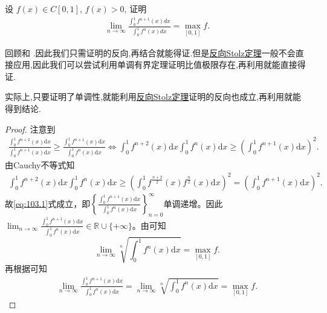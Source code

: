 \documentclass[../../main.tex]{subfiles}
\begin{document}
\begin{example}
设 $f(x) \in C[0,1]$, $f(x) > 0$, 证明
\begin{align*}
\lim_{n \to \infty} \frac{\int_0^1 f^{n+1}(x) dx}{\int_0^1 f^n(x) dx} = \max_{[0,1]} f.
\end{align*}
\end{example}
\begin{note}
回顾和
.因此我们只需证明的反向,再结合就能得证.但是\hyperref[theorem:反向Stolz定理]{反向Stolz定理}一般不会直接应用,因此我们可以尝试利用单调有界定理证明比值极限存在,再利用就能直接得证.

实际上,只要证明了单调性,就能利用\hyperref[theorem:反向Stolz定理]{反向Stolz定理}证明的反向也成立,再利用就能得到结论.
\end{note}
\begin{proof}
注意到
\begin{align}
\frac{\int_0^1 f^{n+2}(x) \mathrm{d}x}{\int_0^1 f^{n+1}(x) \mathrm{d}x} \geqslant \frac{\int_0^1 f^{n+1}(x) \mathrm{d}x}{\int_0^1 f^n(x) \mathrm{d}x} \Longleftrightarrow \int_0^1 f^{n+2}(x) \mathrm{d}x \int_0^1 f^n(x) \mathrm{d}x \geqslant \left( \int_0^1 f^{n+1}(x) \mathrm{d}x \right)^2.\label{eq:103.1}
\end{align}
由Cauchy不等式知
\begin{align*}
\int_0^1 f^{n+2}(x) \mathrm{d}x \int_0^1 f^n(x) \mathrm{d}x \geqslant \left( \int_0^1 f^{\frac{n+2}{2}}(x) f^{\frac{n}{2}}(x) \mathrm{d}x \right)^2 = \left( \int_0^1 f^{n+1}(x) \mathrm{d}x \right)^2.
\end{align*}
故\eqref{eq:103.1}式成立，即$\left\{ \frac{\int_0^1 f^{n+1}(x) \mathrm{d}x}{\int_0^1 f^n(x) \mathrm{d}x} \right\}_{n=0}^{\infty}$单调递增。因此$\lim_{n \to \infty} \frac{\int_0^1 f^{n+1}(x) \mathrm{d}x}{\int_0^1 f^n(x) \mathrm{d}x} \in \mathbb{R} \cup \{ +\infty \}$。由可知$$\lim_{n \to \infty} \sqrt[n]{\int_0^1 f^n(x) \mathrm{d}x} = \max_{[0,1]} f.$$再根据可知
\begin{align*}
\lim_{n \to \infty} \frac{\int_0^1 f^{n+1}(x) \mathrm{d}x}{\int_0^1 f^n(x) \mathrm{d}x} = \lim_{n \to \infty} \sqrt[n]{\int_0^1 f^n(x) \mathrm{d}x} = \max_{[0,1]} f.
\end{align*}
\end{proof}
\end{document}
